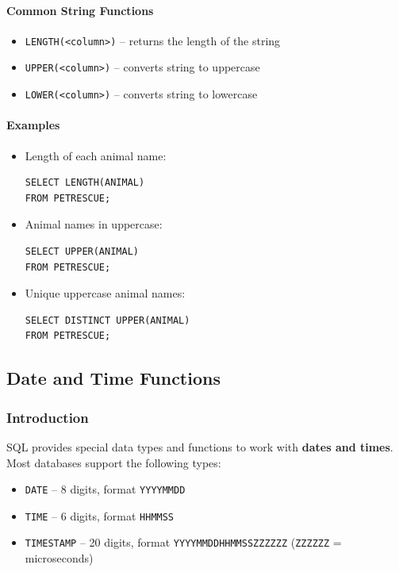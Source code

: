 \documentclass{article}
\begin{document}
\paragraph{Common String Functions}
\begin{itemize}
    \item \texttt{LENGTH(<column>)} – returns the length of the string
    \item \texttt{UPPER(<column>)} – converts string to uppercase
    \item \texttt{LOWER(<column>)} – converts string to lowercase
\end{itemize}

\paragraph{Examples}
\begin{itemize}
    \item Length of each animal name:
\begin{verbatim}
SELECT LENGTH(ANIMAL)
FROM PETRESCUE;
\end{verbatim}

    \item Animal names in uppercase:
\begin{verbatim}
SELECT UPPER(ANIMAL)
FROM PETRESCUE;
\end{verbatim}

    \item Unique uppercase animal names:
\begin{verbatim}
SELECT DISTINCT UPPER(ANIMAL)
FROM PETRESCUE;
\end{verbatim}
\end{itemize}

\subsection{Date and Time Functions}

\subsubsection{Introduction}
SQL provides special data types and functions to work with \textbf{dates and times}.  
Most databases support the following types:
\begin{itemize}
    \item \texttt{DATE} – 8 digits, format \texttt{YYYYMMDD}
    \item \texttt{TIME} – 6 digits, format \texttt{HHMMSS}
    \item \texttt{TIMESTAMP} – 20 digits, format \texttt{YYYYMMDDHHMMSSZZZZZZ} (\texttt{ZZZZZZ} = microseconds)
\end{itemize}
\end{document}
